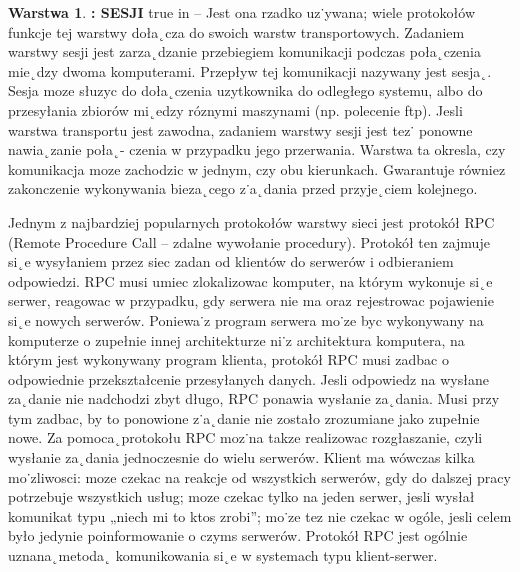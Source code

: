 \documentclass[a4paper,11pt]{article}
\theoremstyle{definition}
\newtheorem{tw}{Warstwa}
\begin{document}
 \begin{tw}\textbf{: SESJI}
 	 true in 
 	-- Jest ona rzadko uz˙ywana; wiele protokołów funkcje tej warstwy doła˛cza
 	do swoich warstw transportowych. Zadaniem warstwy sesji jest zarza˛dzanie przebiegiem
 	komunikacji podczas poła˛czenia mie˛dzy dwoma komputerami. Przepływ tej komunikacji
 	nazywany jest sesja˛. Sesja moze słuzyc do doła˛czenia uzytkownika do odległego systemu,
 	albo do przesyłania zbiorów mi˛edzy róznymi maszynami (np. polecenie ftp). Jesli warstwa
 	transportu jest zawodna, zadaniem warstwy sesji jest tez˙ ponowne nawia˛zanie poła˛-
 	czenia w przypadku jego przerwania. Warstwa ta okresla, czy komunikacja moze zachodzic
 	w jednym, czy obu kierunkach. 	
 	Gwarantuje równiez zakonczenie wykonywania bieza˛cego
 	z˙a˛dania przed przyje˛ciem kolejnego.\medskip
 	
 	\noindent \hspace{0.9cm} 	
 	Jednym z najbardziej popularnych protokołów warstwy sieci jest protokół RPC (Remote
 	Procedure Call – zdalne wywołanie procedury). Protokół ten zajmuje si˛e wysyłaniem przez
 	siec zadan od klientów do serwerów i odbieraniem odpowiedzi. RPC musi umiec zlokalizowac komputer, na którym wykonuje si˛e serwer, reagowac w przypadku, gdy serwera nie ma
 	oraz rejestrowac pojawienie si˛e nowych serwerów. Poniewa˙z program serwera mo˙ze byc wykonywany na komputerze o zupełnie innej architekturze ni˙z architektura komputera, na
 	którym jest wykonywany program klienta, protokół RPC musi zadbac o odpowiednie przekształcenie
 	przesyłanych danych. Jesli odpowiedz na wysłane za˛danie nie nadchodzi zbyt
 	długo, RPC ponawia wysłanie za˛dania. Musi przy tym zadbac, by to ponowione z˙a˛danie nie
 	zostało zrozumiane jako zupełnie nowe. Za pomoca˛protokołu RPC moz˙na takze realizowac
 	rozgłaszanie, czyli wysłanie za˛dania jednoczesnie do wielu serwerów. Klient ma wówczas
 	kilka mo˙zliwosci: moze czekac na reakcje od wszystkich serwerów, gdy do dalszej pracy
 	potrzebuje wszystkich usług; moze czekac tylko na jeden serwer, jesli wysłał komunikat
 	typu „niech mi to ktos zrobi”; mo˙ze tez nie czekac w ogóle, jesli celem było jedynie poinformowanie
 	o czyms serwerów. Protokół RPC jest ogólnie uznana˛metoda˛ komunikowania
 	si˛e w systemach typu klient-serwer.
 \end{tw}
\end{document}

